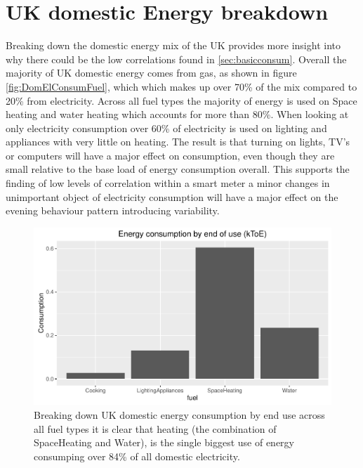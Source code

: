 


\chapter{UK domestic Energy breakdown}
\label{sec:Energybreakdown}
Breaking down the domestic energy mix of the UK \cite{domesticenergyv2pdfwithnotes2005} provides more insight into why there could be the low correlations found in \ref{sec:basicconsum}. Overall the majority of UK domestic energy comes from gas, as shown in figure \ref{fig:DomElConsumFuel}, which which makes up over 70\% of the mix compared to 20\% from electricity. Across all fuel types the majority of energy is used on Space heating and water heating which accounts for more than 80\%. When looking at only electricity consumption over 60\% of electricity is used on lighting and appliances with very little on heating. The result is that turning on lights, TV's or computers will have a major effect on consumption, even though they are small relative to the base load of energy consumption overall. This supports the finding of low levels of correlation within a smart meter a minor changes in unimportant object of electricity consumption will have a major effect on the evening behaviour pattern introducing variability.

\begin{figure}
    \centering
    \includegraphics[width =\textwidth]{Figures/Appendix/DomConsumType}
    \caption[Domestic energy consumption by end of use]{Breaking down UK domestic energy consumption by end use across all fuel types it is clear that heating (the combination of SpaceHeating and Water), is the single biggest use of energy consumping over 84\% of all domestic electricity.}
    \label{fig:DomConsumType}
\end{figure}

